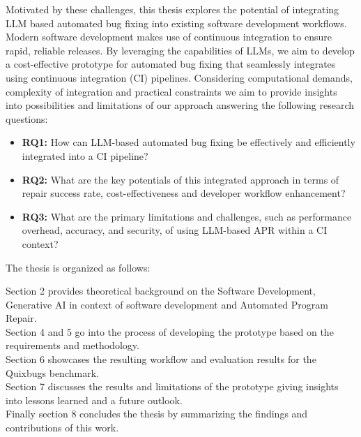 Motivated by these challenges, this thesis explores the potential of integrating LLM based automated bug fixing into existing software development workflows. Modern software development  makes use of continuous integration to ensure rapid, reliable releases. \cite{ugwuezeContinuousIntegrationDeployment2024} By leveraging the capabilities of LLMs, we aim to develop a cost-effective prototype for automated bug fixing that seamlessly integrates using continuous integration (CI) pipelines. Considering computational demands, complexity of integration and practical constraints we aim to provide insights into possibilities and limitations of our approach answering the following research questions:

\begin{itemize}
    \item \textbf{RQ1:} How can LLM-based automated bug fixing be effectively and efficiently integrated into a CI pipeline?
    \item \textbf{RQ2:} What are the key potentials of this integrated approach in terms of repair success rate, cost-effectiveness and developer workflow enhancement?
    \item \textbf{RQ3:} What are the primary limitations and challenges, such as performance overhead, accuracy, and security, of using LLM-based APR within a CI context?
\end{itemize}


The thesis is organized as follows:

Section 2 provides theoretical background on the Software Development, Generative AI in context of software development and Automated Program Repair.\\
Section 4 and 5 go into the process of developing the prototype based on the requirements and methodology.\\
Section 6 showcases the resulting workflow and evaluation results for the Quixbugs benchmark.\\
Section 7 discusses the results and limitations of the prototype giving insights into lessons learned and a future outlook.\\
Finally section 8 concludes the thesis by summarizing the findings and contributions of this work.